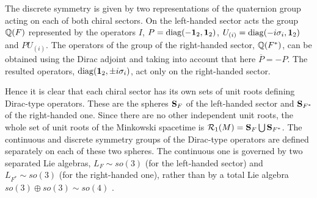\documentclass[a4paper,12pt]{article}
\begin{document}
The discrete symmetry is given by two representations of the quaternion group 
acting on each of both chiral sectors. On the left-handed sector acts the 
group  ${\Bbb Q}(F)$ represented by the operators $I$, 
$P={\rm diag}(-{\bf 1}_2,{\bf 1}_2)$, 
$U_{(i)}={\rm diag}(-i\sigma_i, {\bf 1}_2)$ and  $P U_{(i)}$. The operators 
of the group of the right-handed sector, ${\Bbb Q}(F^*)$, can be 
obtained using the Dirac adjoint and taking into account that here 
$\overline{P}=-P$. The resulted operators, 
${\rm diag}({\bf 1}_2, \pm i\sigma_i)$, 
act only on the right-handed sector. 

Hence it is clear that each chiral sector has its own sets of unit roots 
defining Dirac-type operators. These are  the spheres ${\bf S}_F$ of the 
left-handed sector and ${\bf S}_{F^*}$ of the right-handed one. Since there are 
no other independent unit roots, the whole set of unit roots  of the Minkowski 
spacetime is ${\cal R}_1(M)={\bf S}_{F}\bigcup {\bf S}_{F^*}$. The continuous 
and discrete symmetry groups of the Dirac-type operators are defined separately 
on each of these two spheres. The continuous one is governed by two separated 
Lie algebras, $L_F\sim so(3)$ (for the left-handed sector) and 
$L_{F^*}\sim so(3)$ (for the right-handed one), rather than by a total Lie 
algebra $so(3)\oplus so(3)\sim so(4)$ \cite{K2}. 
 
\end{document}
